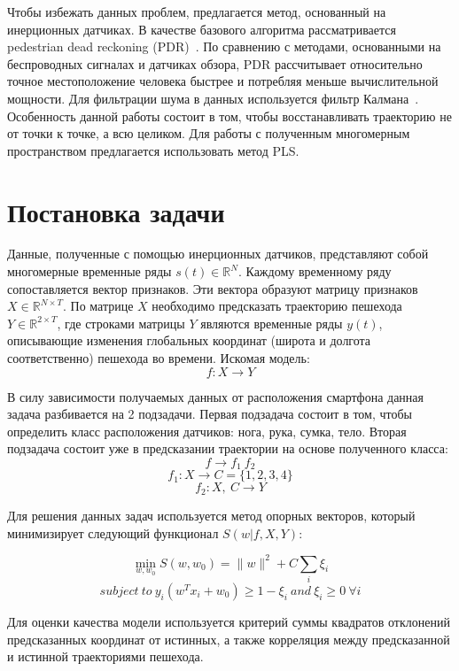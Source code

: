 \documentclass[12pt,twoside]{article}
\begin{document}
Чтобы избежать данных проблем, предлагается метод, основанный на инерционных датчиках. В качестве базового алгоритма рассматривается pedestrian dead reckoning (PDR)~\cite{7743695}. По сравнению с методами, основанными на беспроводных сигналах и датчиках обзора, PDR рассчитывает относительно точное местоположение человека быстрее и потребляя меньше вычислительной мощности. Для фильтрации шума в данных используется фильтр Калмана~\cite{journals/corr/abs-1712-09004}. Особенность данной работы состоит в том, чтобы восстанавливать траекторию не от точки к точке, а всю целиком. Для работы с полученным многомерным пространством предлагается использовать метод PLS\cite{10.1007/11752790_2}.

\section{Постановка задачи}
Данные, полученные с помощью инерционных датчиков, представляют собой многомерные временные ряды $s(t) \in \mathbb{R}^N$. Каждому временному ряду сопоставляется вектор признаков. Эти вектора образуют матрицу признаков $X \in \mathbb{R}^{N \times T}$. По матрице $X$ необходимо предсказать траекторию пешехода $Y \in \mathbb{R}^{2 \times T}$, где строками матрицы $Y$ являются временные ряды $y(t)$, описывающие изменения глобальных координат (широта и долгота соответственно) пешехода во времени. Искомая модель:
\[f: X \to Y\]

В силу зависимости получаемых данных от расположения смартфона данная задача разбивается на 2 подзадачи. Первая подзадача состоит в том, чтобы определить класс расположения датчиков: нога, рука, сумка, тело. Вторая подзадача состоит уже в предсказании траектории на основе полученного класса:
\[f \to f_1 ~ f_2\]
\[f_1: X \to C = \{1, 2, 3, 4\}\]
\[f_2: X, ~C \to Y\]

Для решения данных задач используется метод опорных векторов, который минимизирует следующий функционал $S(w|f, X, Y)$:

\[\min_{w, w_0}S(w, w_0) = \|w\|^2+C\sum_{i}\xi_i\]
\[subject~to~y_i(w^Tx_i+w_0)\geq 1-\xi_i~and~\xi_i \geq 0~\forall i\]

Для оценки качества модели используется критерий суммы квадратов отклонений предсказанных координат от истинных, а также корреляция между предсказанной и истинной траекториями пешехода.

\begin{comment}
Предполагается, что скорости, полученные в ходе решения данной задачи, содержат смещение $x^f_I$ ($I$ - система координат устройства), вызванное ошибками измерений датчиков. Относительно данного смещения делается предположение, что оно является низко-частотным. В результате решается следующая задача минимизации:
\[\min_{\{x^1_I, x^51_I,\dots\}}\sum_{f \in F_2}\|v_C^F-v_R^f\|+
\lambda\sum_{f \in F_1}\|x^f_I\|^2,\]
\[v_C^f = R_{SW}^f\sum_{f'=1}^f R_{WI}^{f'}(a_I^{f'}+x_I^{f'}),\]
где $f$ - единица блока выборки, $F$ - блок выборки, $v_C^F$ - скорректированное значение скорости, $v_R^f$ - предсказанное значение скорости, $W$ - глобальная система координат, $S$ - IMU-стабилизированная система координат, $R_{AB}$ - матрица перехода из системы координат $B$ в систему координат $A$.
\end{comment}
\end{document}
